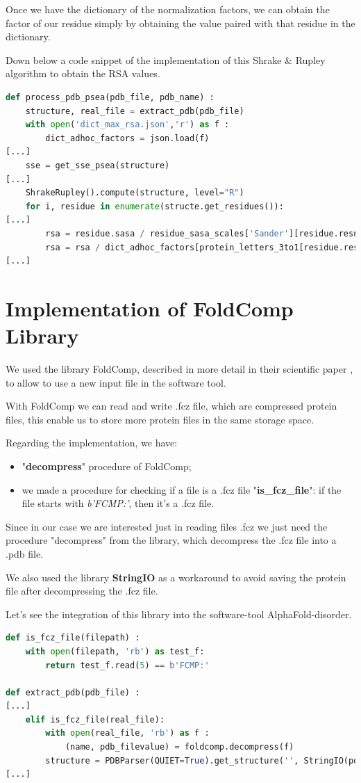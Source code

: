 Once we have the dictionary of the normalization factors, we can obtain the factor of our residue simply by obtaining the value paired with that residue in the dictionary.

Down below a code snippet of the implementation of this Shrake \& Rupley algorithm to obtain the RSA values.

\begin{lstlisting}[language=Python, caption=Integration of rsa with SASA on process\_pdb\_psea procedure]
def process_pdb_psea(pdb_file, pdb_name) :
    structure, real_file = extract_pdb(pdb_file)
    with open('dict_max_rsa.json','r') as f :
        dict_adhoc_factors = json.load(f)
[...]
    sse = get_sse_psea(structure)
[...]
    ShrakeRupley().compute(structure, level="R")
    for i, residue in enumerate(structe.get_residues()):
[...]
        rsa = residue.sasa / residue_sasa_scales['Sander'][residue.resname]
        rsa = rsa / dict_adhoc_factors[protein_letters_3to1[residue.resname]]
[...]
\end{lstlisting}

\pagebreak

\section{Implementation of FoldComp Library}
We used the library FoldComp, described in more detail in their scientific paper \cite{foldcomp}, to allow to use a new input file in the software tool.

With FoldComp we can read and write .fcz file, which are compressed protein files, this enable us to store more protein files in the same storage space.

Regarding the implementation, we have:
\begin{itemize}
    \item "\textbf{decompress}" procedure of FoldComp;
    \item we made a procedure for checking if a file is a .fcz file "\textbf{is\_fcz\_file}": if the file starts with \textit{b'FCMP:'}, then it's a .fcz file.
\end{itemize}
Since in our case we are interested just in reading files .fcz we just need the procedure "decompress" from the library, which decompress the .fcz file into a .pdb file.

We also used the library \textbf{StringIO} as a workaround to avoid saving the protein file after decompressing the .fcz file.

Let's see the integration of this library into the software-tool AlphaFold-disorder.

\begin{lstlisting}[language=Python, caption=Integration of FoldComp]
def is_fcz_file(filepath) :
    with open(filepath, 'rb') as test_f:
        return test_f.read(5) == b'FCMP:'

def extract_pdb(pdb_file) :
[...]
    elif is_fcz_file(real_file):
        with open(real_file, 'rb') as f :
            (name, pdb_filevalue) = foldcomp.decompress(f)
        structure = PDBParser(QUIET=True).get_structure('', StringIO(pdb_filevalue))
[...]
\end{lstlisting}

